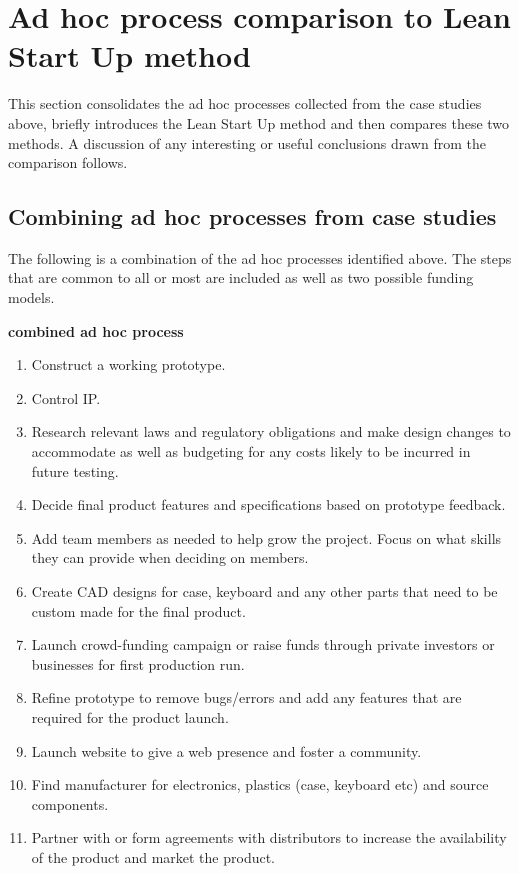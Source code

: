 \section{Ad hoc process comparison to Lean Start Up method}
This section consolidates the ad hoc processes collected from the case studies above, briefly introduces the Lean Start Up method and then compares these two methods. A discussion of any interesting or useful conclusions drawn from the comparison follows.

\subsection{Combining ad hoc processes from case studies}
The following is a combination of the ad hoc processes identified above. The steps that are common to all or most are included as well as two possible funding models.

\textbf{combined ad hoc process}\\
\begin{enumerate}
\item Construct a working prototype.
\item Control IP.
\item Research relevant laws and regulatory obligations and make design changes to accommodate as well as budgeting for any costs likely to be incurred in future testing.
\item Decide final product features and specifications based on prototype feedback.
\item Add team members as needed to help grow the project. Focus on what skills they can provide when deciding on members.
\item Create CAD designs for case, keyboard and any other parts that need to be custom made for the final product.
\item Launch crowd-funding campaign or raise funds through private investors or businesses for first production run.
\item Refine prototype to remove bugs/errors and add any features that are required for the product launch.
\item Launch website to give a web presence and foster a community.
\item Find manufacturer for electronics, plastics (case, keyboard etc) and source components.
\item Partner with or form agreements with distributors to increase the availability of the product and market the product.
\end{enumerate} 

